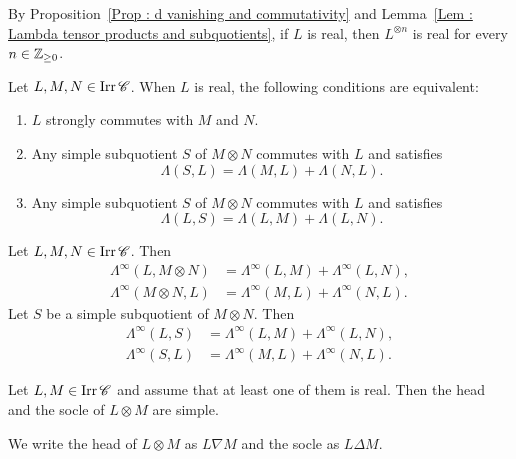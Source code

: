 By Proposition~\ref{Prop : d vanishing and commutativity}
and Lemma~\ref{Lem : Lambda tensor products and subquotients},
if $L$ is real, then $L^{\otimes n}$ is real for every $n \in \mathbb{Z}_{\geq 0}$.

\begin{Prop}
\label{Prop : commutativity with simple subquotients}
Let $L, M, N \in \mathop{\mathrm{Irr}}\nolimits\mathscr{C}$.
When $L$ is real, the following conditions are equivalent:
\begin{enumerate}
    \item[(a)] $L$ strongly commutes with $M$ and $N$.
    \item[(b)] Any simple subquotient $S$ of $M \otimes N$
    commutes with $L$ and satisfies
    \[
    \Lambda(S, L) = \Lambda(M, L) + \Lambda(N, L).
    \]
    \item[(c)] Any simple subquotient $S$ of $M \otimes N$
    commutes with $L$ and satisfies
    \[
    \Lambda(L, S) = \Lambda(L, M) + \Lambda(L, N).
    \]
\end{enumerate}
\end{Prop}

\begin{Lem}
\label{Lem : Lambda infinity tensor products and subquotients}
Let $L, M, N \in \mathop{\mathrm{Irr}}\nolimits\mathscr{C}$.
Then
\[
\begin{aligned}
\Lambda^{\infty}(L, M \otimes N)
&= \Lambda^{\infty}(L, M) + \Lambda^{\infty}(L, N), \\
\Lambda^{\infty}(M \otimes N, L)
&= \Lambda^{\infty}(M, L) + \Lambda^{\infty}(N, L).
\end{aligned}
\]
Let $S$ be a simple subquotient of $M \otimes N$.
Then
\[
\begin{aligned}
\Lambda^{\infty}(L, S)
&= \Lambda^{\infty}(L, M) + \Lambda^{\infty}(L, N), \\
\Lambda^{\infty}(S, L)
&= \Lambda^{\infty}(M, L) + \Lambda^{\infty}(N, L).
\end{aligned}
\]
\end{Lem}

\begin{Prop}
\label{Prop : simplicity of heads and socles}
Let $L, M \in \mathop{\mathrm{Irr}}\nolimits\mathscr{C}$
and assume that at least one of them is real.
Then the head and the socle of $L \otimes M$ are simple.
\end{Prop}

We write the head of $L \otimes M$ as $L \nabla M$
and the socle as $L \Delta M$. 

